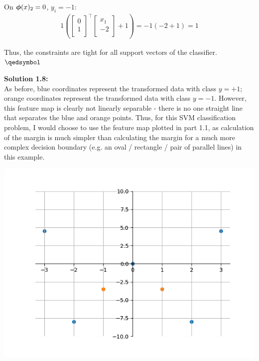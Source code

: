 \documentclass[submit]{harvardml}
\begin{document}
On $\boldsymbol{\phi}(x)_2 = 0$, $y_i = -1$:
\begin{align*}
    1\left(\begin{bmatrix} 0\\ 1\\ \end{bmatrix}^\top \begin{bmatrix} x_1\\ -2\\ \end{bmatrix} + 1\right) = -1(-2+1) = 1
\end{align*}

Thus, the constraints are tight for all support vectors of the classifier. $\qedsymbol$

\noindent\textbf{Solution 1.8:}\\
As before, blue coordinates represent the transformed data with class $y = +1$; orange coordinates represent the transformed data with class $y = -1$. However, this feature map is clearly not linearly separable - there is no one straight line that separates the blue and orange points. Thus, for this SVM classification problem, I would choose to use the feature map plotted in part 1.1, as calculation of the margin is much simpler than calculating the margin for a much more complex decision boundary (e.g. an oval / rectangle / pair of parallel lines) in this example.
\begin{center}
    \includegraphics[scale=0.6]{1.8.png}
\end{center}

\end{document}
